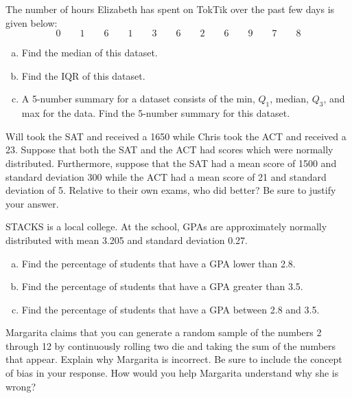 \documentclass[11pt,letterpaper]{article}
\begin{document}

 The number of hours Elizabeth has spent on TokTik over the past few days is given below:
	\[
	0 \qquad 1 \qquad 6 \qquad 1 \qquad 3 \qquad 6 \qquad 2 \qquad 6 \qquad 9 \qquad 7 \qquad 8  
	\] 

\begin{enumerate}[(a)]
\item Find the median of this dataset.
\item Find the IQR of this dataset. 
\item A 5-number summary for a dataset consists of the min, $Q_1$, median, $Q_3$, and max for the data. Find the 5-number summary for this dataset. 
\end{enumerate}



\newpage



 Will took the SAT and received a 1650 while Chris took the ACT and received a 23. Suppose that both the SAT and the ACT had scores which were normally distributed. Furthermore, suppose that the SAT had a mean score of 1500 and standard deviation 300 while the ACT had a mean score of 21 and standard deviation of 5. Relative to their own exams, who did better? Be sure to justify your answer. \pspace



\newpage



 STACKS is a local college. At the school, GPAs are approximately normally distributed with mean 3.205 and standard deviation 0.27. 
	\begin{enumerate}[(a)]
	\item Find the percentage of students that have a GPA lower than 2.8.
	\item Find the percentage of students that have a GPA greater than 3.5. 
	\item Find the percentage of students that have a GPA between 2.8 and 3.5. 
	\end{enumerate}



\newpage



 Margarita claims that you can generate a random sample of the numbers 2 through 12 by continuously rolling two die and taking the sum of the numbers that appear. Explain why Margarita is incorrect. Be sure to include the concept of bias in your response. How would you help Margarita understand why she is wrong?
\end{document}
